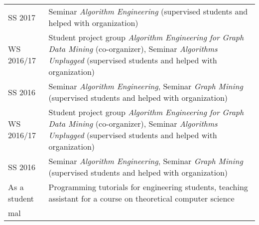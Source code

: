 \documentclass[11pt, a4paper, DIV=14, headings=small]{scrartcl}
\begin{document}
\begin{longtabu}{p{2.1cm}p{12.0cm}}
		SS 2017    & Seminar \emph{Algorithm Engineering} (supervised students and helped with organization)                                                                                         \\
		WS 2016/17 & Student project group \emph{Algorithm Engineering for Graph Data Mining} (co-organizer), Seminar \emph{Algorithms Unplugged} (supervised students and helped with organization) \\
		SS 2016    & Seminar \emph{Algorithm Engineering}, Seminar \emph{Graph Mining} (supervised students and helped with organization)                                                            \\
		WS 2016/17   & Student project group \emph{Algorithm Engineering for Graph Data Mining} (co-organizer), Seminar \emph{Algorithms Unplugged} (supervised students and helped with organization) \\
		SS 2016      & Seminar \emph{Algorithm Engineering}, Seminar \emph{Graph Mining} (supervised students and helped with organization)                                                            \\
		As a student & Programming tutorials for engineering students, teaching assistant for a course on theoretical computer science                                                                 \\
mal	\end{longtabu}
\end{document}
